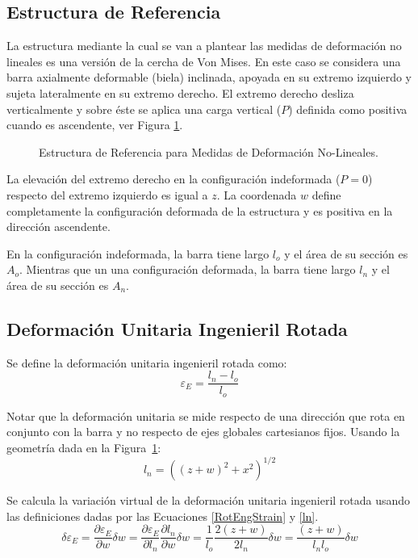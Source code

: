 \subsection{Estructura de Referencia} \label{sec:cerchamises}

La estructura mediante la cual se van a plantear las medidas de deformación no lineales es una versión de la cercha de Von Mises. En este caso se considera una barra axialmente deformable (biela) inclinada, apoyada en su extremo izquierdo y sujeta lateralmente en su extremo derecho. El extremo derecho desliza verticalmente y sobre éste se aplica una carga vertical ($P$) definida como positiva cuando es ascendente, ver Figura \ref{fig:nonlinstrainm}.

\begin{figure}[htb]
	\centering
	\def\svgwidth{0.6\textwidth}

	\caption{Estructura de Referencia para Medidas de Deformación No-Lineales.}
	\label{fig:nonlinstrainm}
\end{figure}

La elevación del extremo derecho en la configuración indeformada ($P=0$) respecto del extremo izquierdo es igual a $z$. La coordenada $w$ define completamente la configuración deformada de la estructura y es positiva en la dirección ascendente.

En la configuración indeformada, la barra tiene largo $l_o$ y el área de su sección es $A_o$. Mientras que un una configuración deformada, la barra tiene largo $l_n$ y el área de su sección es $A_n$.

\subsection{Deformación Unitaria Ingenieril Rotada}

Se define la deformación unitaria ingenieril rotada como:
%
\begin{equation}\label{RotEngStrain}
\varepsilon_E = \frac{l_n-l_o}{l_o}
\end{equation}

Notar que la deformación unitaria se mide respecto de una dirección que rota en conjunto con la barra y no respecto de ejes globales cartesianos fijos. Usando la geometría dada en la Figura~\ref{fig:nonlinstrainm}:
%
\begin{equation}\label{ln}
l_n = \left((z+w)^2+x^2\right)^{1/2}
\end{equation}

Se calcula la variación virtual de la deformación unitaria ingenieril rotada usando las definiciones dadas por las Ecuaciones \eqref{RotEngStrain} y \eqref{ln}.
%
\begin{equation}\label{VirtEngStrain}
\delta \varepsilon_E = \frac{\partial \varepsilon_E}{\partial w} \delta w = \frac{\partial \varepsilon_E}{\partial l_n}\frac{\partial l_n}{\partial w}\delta w =	\frac{1}{l_o}\frac{2(z+w)}{2l_n}\delta w = \frac{(z+w)}{l_n l_o}\delta w
\end{equation}

